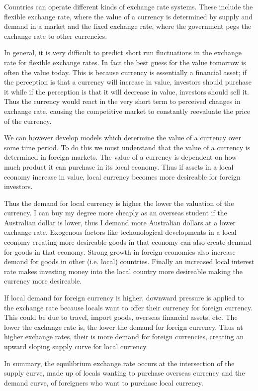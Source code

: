 \documentclass[12pt]{report}
\begin{document}
\begin{flushleft}
Countries can operate different kinds of exchange rate systems. These include
the flexible exchange rate, where the value of a currency is determined by
supply and demand in a market and the fixed exchange rate, where the government
pegs the exchange rate to other currencies. \par
In general, it is very difficult to predict short run fluctuations in the
exchange rate for flexible exchange rates. In fact the best guess for the value
tomorrow is often the value today. This is because currency is essentially a
financial asset; if the perception is that a currency will increase in value,
investors should purchase it while if the perception is that it will decrease
in value, investors should sell it. Thus the currency would react in the very
short term to perceived changes in exchange rate, causing the competitive
market to constantly reevaluate the price of the currency. \par
We can however develop models which determine the value of a currency over some
time period. To do this we must understand that the value of a currency is
determined in foreign markets. The value of a currency is dependent on how much
product it can purchase in its local economy. Thus if assets in a local economy
increase in value, local currency becomes more desireable for foreign
investors. \par
Thus the demand for local currency is higher the lower the valuation of the
currency. I can buy my degree more cheaply as an overseas student if the
Australian dollar is lower, thus I demand more Australian dollars at a lower
exchange rate. Exogenous factors like techonological developments in a local
economy creating more desireable goods in that economy can also create demand
for goods in that economy. Strong growth in foreign economies also increase
demand for goods in other (i.e. local) countries. Finally an increased local
interest rate makes investing money into the local country more desireable
making the currency more desireable. \par
If local demand for foreign currency is higher, downward pressure is applied to
the exchange rate because locals want to offer their currency for foreign
currency. This could be due to travel, import goods, overseas financial assets,
etc. The lower the exchange rate is, the lower the demand for foreign currency.
Thus at higher exchange rates, their is more demand for foreign currencies,
creating an upward sloping supply curve for local currency. \par
In summary, the equilibrium exchange rate occurs at the intersection of the
supply curve, made up of locals wanting to purchase overseas currency and the
demand curve, of foreigners who want to purchase local currency.


\end{flushleft}
\end{document}
